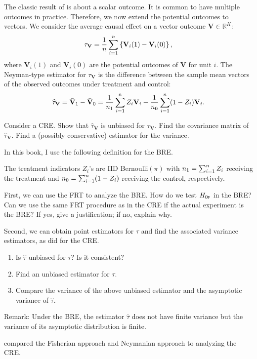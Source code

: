 \begin{HomeworkProblem}\label{exr:4-6}

The classic result of \citet{Neyman:1923} is about a scalar outcome. It is common to have multiple outcomes in practice. Therefore, we now extend the potential outcomes to vectors. We consider the average causal effect on a vector outcome $\mathbf{V}  \in \mathbb{R}^K$:
\[
\tau_{\mathbf{V}} = \frac{1}{n}  \sum_{i=1}^n \left\{  \mathbf{V}_i(1) - \mathbf{V}_i(0) \right\},
\]
where $\mathbf{V}_i(1)$ and $\mathbf{V}_i(0)$ are the potential outcomes of $\mathbf{V}$ for unit $i$.
The Neyman-type estimator for $\tau_{\mathbf{V}}$ is the difference between the sample mean vectors of the observed outcomes under treatment and control:
\[
\widehat{ \tau}_{\mathbf{V}} = \bar{\mathbf{V}}_1  - \bar{\mathbf{V}}_0
= \frac{1}{n_1}   \sum_{i=1}^n Z_i  \mathbf{V}_i   - \frac{1}{n_0}  \sum_{i=1}^n (1-Z_i) \mathbf{V}_i .
\]


Consider a CRE. Show that $\widehat{ \tau}_{\mathbf{V}} $ is unbiased for $\tau_{\mathbf{V}} $. Find the covariance matrix of $\widehat{ \tau}_{\mathbf{V}} $. Find a (possibly conservative) estimator for the variance.


\end{HomeworkProblem}

\begin{HomeworkProblem}\label{exr:4-7}


In this book, I use the following definition for the BRE.

\begin{definition}
[BRE]\label{def::BRE}
The treatment indicators $Z_i$'s are IID Bernoulli$(\pi)$ with $n_1 = \sum_{i=1}^n Z_i$ receiving the treatment and $n_0 = \sum_{i=1}^n (1-Z_i)$ receiving the control, respectively.
\end{definition}



First, we can use the FRT to analyze the BRE. How do we test $H_{0\textsc{f}}$ in the BRE? Can we use the same FRT procedure as in the CRE if the actual experiment is the BRE? If yes, give a justification; if no, explain why.

Second, we can obtain point estimators for $\tau$ and find the associated variance estimators, as \citet{Neyman:1923} did for the CRE.
\begin{enumerate}
\item
Is $\hat{\tau}$ unbiased for $\tau$? Is it consistent?
\item
Find an unbiased estimator for $\tau$.
\item
Compare the variance of the above unbiased estimator and the asymptotic variance of $\hat{\tau}$.
\end{enumerate}

Remark:
Under the BRE, the estimator $\hat{\tau}$ does not have finite variance but the variance of its asymptotic distribution is finite.



\end{HomeworkProblem}

\begin{HomeworkProblem}\label{exr:4-8}

 \citet{Ding:2014} compared the Fisherian approach and Neymanian approach to analyzing the CRE.



\end{HomeworkProblem}
